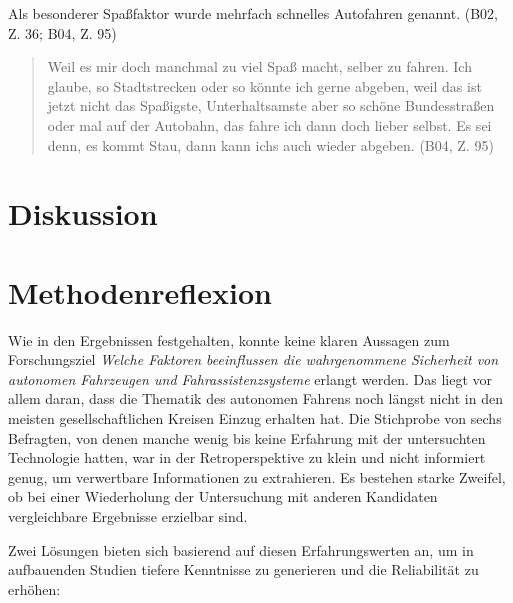\documentclass[12pt]{article}
\begin{document}
Als besonderer Spaßfaktor wurde mehrfach schnelles Autofahren genannt. (B02, Z. 36; B04, Z. 95)

\begin{quote}
  Weil es mir doch manchmal zu viel Spaß macht, selber zu fahren. Ich glaube, so Stadtstrecken oder so könnte ich gerne abgeben, weil das ist jetzt nicht das Spaßigste, Unterhaltsamste aber so schöne Bundesstraßen oder mal auf der Autobahn, das fahre ich dann doch lieber selbst. Es sei denn, es kommt Stau, dann kann ichs auch wieder abgeben. (B04, Z. 95)
\end{quote}


\clearpage
\section{Diskussion}

\clearpage
\section{Methodenreflexion}

Wie in den Ergebnissen festgehalten, konnte keine klaren Aussagen zum Forschungsziel \emph{Welche Faktoren beeinflussen die wahrgenommene Sicherheit von autonomen Fahrzeugen und Fahrassistenzsysteme} erlangt werden.  Das liegt vor allem daran, dass die Thematik des autonomen Fahrens noch längst nicht in den meisten gesellschaftlichen Kreisen Einzug erhalten hat. Die Stichprobe von sechs Befragten, von denen manche wenig bis keine Erfahrung mit der untersuchten Technologie hatten, war in der Retroperspektive zu klein und nicht informiert genug, um verwertbare Informationen zu extrahieren. Es bestehen starke Zweifel, ob bei einer Wiederholung der Untersuchung mit anderen Kandidaten vergleichbare Ergebnisse erzielbar sind.

Zwei Lösungen bieten sich basierend auf diesen Erfahrungswerten an, um in aufbauenden Studien tiefere Kenntnisse zu generieren und die Reliabilität zu erhöhen:
\end{document}
